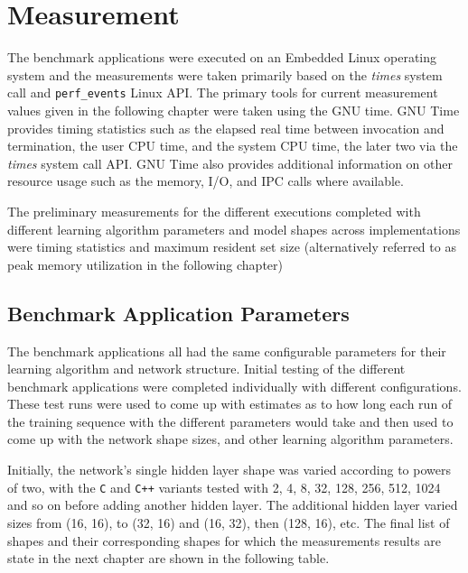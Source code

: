 \chapter{Measurement}

The benchmark applications were executed on an Embedded Linux operating system and the measurements were taken primarily based on the \textit{times} system call and \texttt{perf\_events} Linux API. The primary tools for current measurement values given in the following chapter were taken using the GNU time. GNU Time provides timing statistics such as the elapsed real time between invocation and termination, the user CPU time, and the system CPU time, the later two via the \textit{times} system call API. GNU Time also provides additional information on other resource usage such as the memory, I/O, and IPC calls where available.

The preliminary measurements for the different executions completed with different learning algorithm parameters and model shapes across implementations were timing statistics and maximum resident set size (alternatively referred to as peak memory utilization in the following chapter)

\section{Benchmark Application Parameters}

The benchmark applications all had the same configurable parameters for their learning algorithm and network structure. Initial testing of the different benchmark applications were completed individually with different configurations. These test runs were used to come up with estimates as to how long each run of the training sequence with the different parameters would take and then used to come up with the network shape sizes, and other learning algorithm parameters.

Initially, the network's single hidden layer shape was varied according to powers of two, with the \texttt{C} and \texttt{C++} variants tested with 2, 4, 8, 32, 128, 256, 512, 1024 and so on before adding another hidden layer. The additional hidden layer varied sizes from (16, 16), to (32, 16) and (16, 32), then (128, 16), etc. The final list of shapes and their corresponding shapes for which the measurements results are state in the next chapter are shown in the following table.


